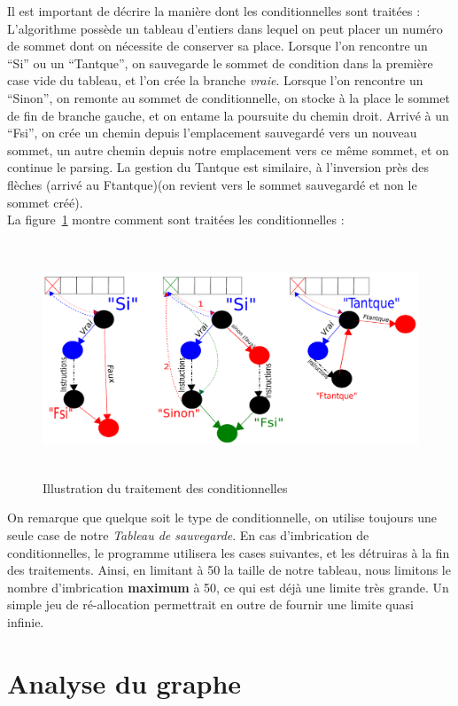 \documentclass[a4paper,11pt]{article}
\begin{document}
		Il est important de décrire la manière dont les conditionnelles sont traitées :\\
		L'algorithme possède un tableau d'entiers dans lequel on peut placer un numéro de sommet dont on nécessite de conserver sa place. Lorsque l'on rencontre un ``Si'' ou un ``Tantque'', on sauvegarde le sommet de condition dans la première case vide du tableau, et l'on crée la branche \textit{vraie}. Lorsque l'on rencontre un ``Sinon'', on remonte au sommet de conditionnelle, on stocke à la place le sommet de fin de branche gauche, et on entame la poursuite du chemin droit. Arrivé à un ``Fsi'', on crée un chemin depuis l'emplacement sauvegardé vers un nouveau sommet, un autre chemin depuis notre emplacement vers ce même sommet, et on continue le parsing. La gestion du Tantque est similaire, à l'inversion près des flèches (arrivé au Ftantque)(on revient vers le sommet sauvegardé et non le sommet créé).\\
		 La figure~\ref{image_cond} montre comment sont traitées les conditionnelles :
		\begin{figure}[!ht]\begin{center}\includegraphics[width=17cm,height=7cm]{dessin.pdf}\caption{Illustration du traitement des conditionnelles}\label{image_cond}\end{center}\end{figure}
	On remarque que quelque soit le type de conditionnelle, on utilise toujours une seule case de notre \textit{Tableau de sauvegarde}. En cas d'imbrication de conditionnelles, le programme utilisera les cases suivantes, et les détruiras à la fin des traitements. Ainsi, en limitant à 50 la taille de notre tableau, nous limitons le nombre d'imbrication \textbf{maximum} à 50, ce qui est déjà une limite très grande. Un simple jeu de ré-allocation permettrait en outre de fournir une limite quasi infinie.
	\section{Analyse du graphe}
\end{document}

